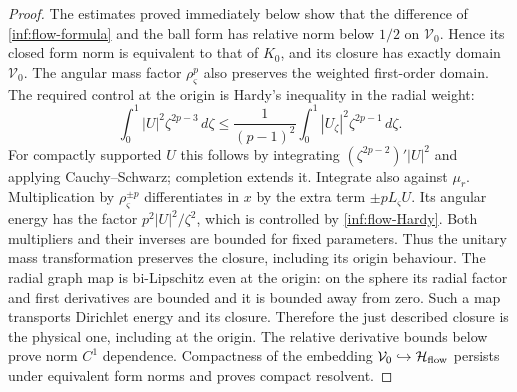 \begin{proof}
The estimates proved immediately below show that the difference of
\eqref{inf:flow-formula} and the ball form has relative norm below
$1/2$ on $\mathcal V_0$. Hence its closed form norm is equivalent to
that of $K_0$, and its closure has exactly domain $\mathcal V_0$.
The angular mass factor $\rho_\varsigma^p$ also preserves the
weighted first-order domain. The required control at the origin
is Hardy's inequality in the radial weight:
\begin{equation}\label{inf:flow-Hardy}
 \int_0^1|U|^2\zeta^{2p-3}\,d\zeta
 \le\frac1{(p-1)^2}
      \int_0^1|U_\zeta|^2\zeta^{2p-1}\,d\zeta.
\end{equation}
For compactly supported $U$ this follows by integrating
$(\zeta^{2p-2})'|U|^2$ and applying Cauchy--Schwarz; completion
extends it. Integrate also against $\mu_r$.
Multiplication by $\rho_\varsigma^{\pm p}$ differentiates in $x$
by the extra term $\pm p L_\varsigma U$. Its angular energy has
the factor $p^2|U|^2/\zeta^2$, which is controlled by
\eqref{inf:flow-Hardy}. Both multipliers and their inverses are
bounded for fixed parameters. Thus the unitary mass transformation
preserves the closure, including its origin behaviour.
The radial graph map is bi-Lipschitz even at the origin: on the
sphere its radial factor and first derivatives are bounded and it
is bounded away from zero. Such a map transports Dirichlet energy
and its closure. Therefore the just described closure is the
physical one, including at the origin. The relative derivative
bounds below prove norm $C^1$ dependence. Compactness of the
embedding $\mathcal V_0\hookrightarrow\mathcal{H}_{\mathrm{flow}}$ persists
under equivalent form norms and proves compact resolvent.
\end{proof}

